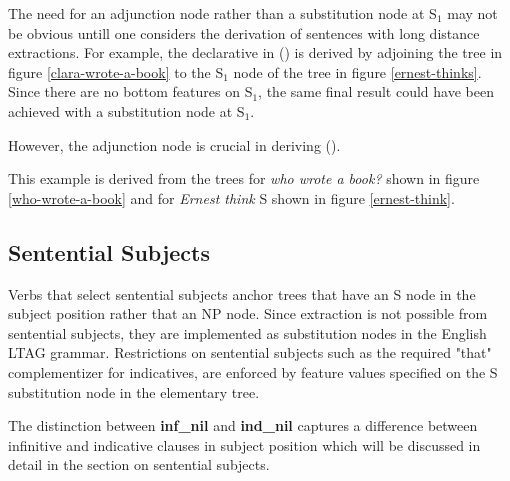 
The need for an adjunction node rather than a substitution node  at
S$_{1}$ may not be obvious untill one considers the derivation of
sentences with long distance extractions.  For example, the
declarative in () is derived by adjoining the tree in figure
\ref{clara-wrote-a-book} to the S$_{1}$ node of the tree in
figure \ref{ernest-thinks}.  Since there are no bottom features on
S$_{1}$, the same final result could have been achieved with a
substitution node at S$_{1}$. 



However, the adjunction node is crucial in deriving ().  


This example is derived from the trees for {\it who wrote a book?} shown
in figure \ref{who-wrote-a-book} and for {\it Ernest think} S shown in
figure \ref{ernest-think}.

\subsection{Sentential Subjects}

Verbs that select sentential subjects anchor trees that have an S node
in the subject position rather that an NP node.  Since extraction is
not possible from sentential subjects, they are implemented as
substitution nodes in the English LTAG grammar.  Restrictions on
sentential subjects such as the required "that" complementizer for
indicatives, are enforced by feature values specified on the S
substitution node in the elementary tree.  

The distinction between {\bf inf\_nil} and {\bf ind\_nil} captures a
difference between infinitive and indicative clauses in subject
position which will be discussed in detail in the section on
sentential subjects.

